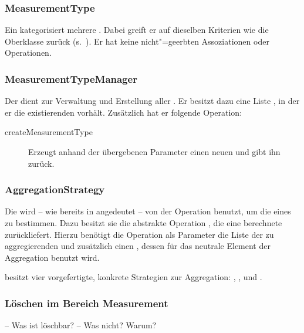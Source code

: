 \subsubsection{MeasurementType}
Ein  kategorisiert mehrere . Dabei greift er auf dieselben Kriterien wie die Oberklasse 
zurück (s.~). Er hat keine nicht"=geerbten Assoziationen oder Operationen.



\subsubsection{MeasurementTypeManager}
Der  dient zur Verwaltung und Erstellung aller . Er besitzt dazu eine Liste ,
in der er die existierenden  vorhält. Zusätzlich hat er folgende Operation:

\begin{description}
	\item[createMeasurementType] Erzeugt anhand der übergebenen Parameter einen neuen  und gibt ihn zurück.
\end{description}


\subsubsection{AggregationStrategy}
Die  wird -- wie bereits in  angedeutet -- von der Operation  benutzt,
um die  eines  zu bestimmen. Dazu besitzt sie die abstrakte Operation , die eine 
berechnete  zurückliefert. Hierzu benötigt die Operation als Parameter die Liste der zu aggregierenden  und
zusätzlich einen , dessen  für das neutrale Element der Aggregation benutzt wird. 

 besitzt vier vorgefertigte, konkrete Strategien zur Aggregation: , ,
 und . 


\subsubsection{Löschen im Bereich Measurement}

-- Was ist löschbar?
-- Was nicht? Warum?